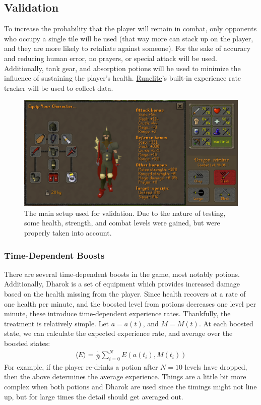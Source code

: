 \documentclass[../../main.tex]{subfiles}
\begin{document}
		\subsection{Validation}
			To increase the probability that the player will remain in combat, only opponents who occupy a single tile will be used (that way more can stack up on the player, and they are more likely to retaliate against someone). For the sake of accuracy and reducing human error, no prayers, or special attack will be used. Additionally, tank gear, and absorption potions will be used to minimize the influence of sustaining the player's health. \href{https://runelite.net/}{Runelite}'s built-in experience rate tracker will be used to collect data.
			\begin{figure}[H]
				\includegraphics[width=\linewidth]{img/Details.png}
				\caption{
					The main setup used for validation. Due to the nature of testing, some health, strength, and combat levels were gained, but were properly taken into account.
				}\label{fig:setup}
			\end{figure}

			\subsubsection{Time-Dependent Boosts}
				There are several time-dependent boosts in the game, most notably potions. Additionally, Dharok is a set of equipment which provides increased damage based on the health missing from the player. Since health recovers at a rate of one health per minute, and the boosted level from potions decreases one level per minute, these introduce time-dependent experience rates. Thankfully, the treatment is relatively simple. Let $a = a(t)$, and $M = M(t)$. At each boosted state, we can calculate the expected experience rate, and average over the boosted states:
				\begin{align}
					\boxed{\langle E \rangle = \frac{1}{N}\sum_{i=0}^{N} E(a(t_i), M(t_i))}
				\end{align}
				For example, if the player re-drinks a potion after $N=10$ levels have dropped, then the above determines the average experience. Things are a little bit more complex when both potions and Dharok are used since the timings might not line up, but for large times the detail should get averaged out.
\end{document}
